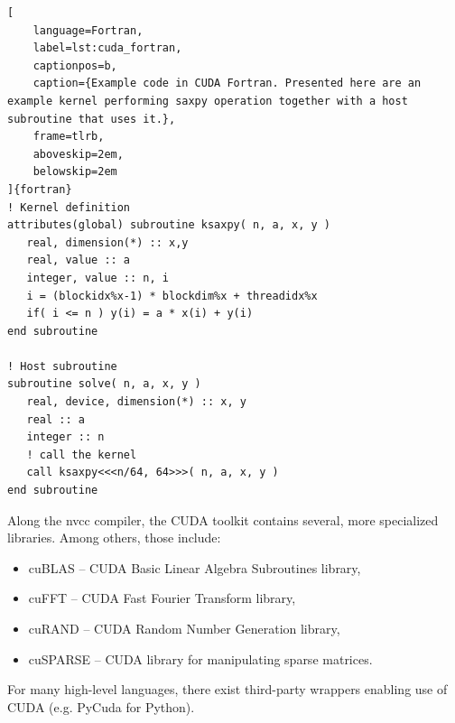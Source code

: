 \begin{lstlisting}[
    language=Fortran,
    label=lst:cuda_fortran,
    captionpos=b,
    caption={Example code in CUDA Fortran. Presented here are an example kernel performing saxpy operation together with a host subroutine that uses it.},
    frame=tlrb,
    aboveskip=2em,
    belowskip=2em
]{fortran}
! Kernel definition
attributes(global) subroutine ksaxpy( n, a, x, y )
   real, dimension(*) :: x,y
   real, value :: a
   integer, value :: n, i
   i = (blockidx%x-1) * blockdim%x + threadidx%x
   if( i <= n ) y(i) = a * x(i) + y(i)
end subroutine

! Host subroutine
subroutine solve( n, a, x, y )
   real, device, dimension(*) :: x, y
   real :: a
   integer :: n
   ! call the kernel
   call ksaxpy<<<n/64, 64>>>( n, a, x, y )
end subroutine
\end{lstlisting}

Along the nvcc compiler, the CUDA toolkit contains several, more specialized libraries. Among others, those include:
\begin{itemize}
    \item cuBLAS -- CUDA Basic Linear Algebra Subroutines library,
    \item cuFFT -- CUDA Fast Fourier Transform library,
    \item cuRAND -- CUDA Random Number Generation library,
    \item cuSPARSE -- CUDA library for manipulating sparse matrices.
\end{itemize}
For many high-level languages, there exist third-party wrappers enabling use of CUDA (e.g. PyCuda for Python).


